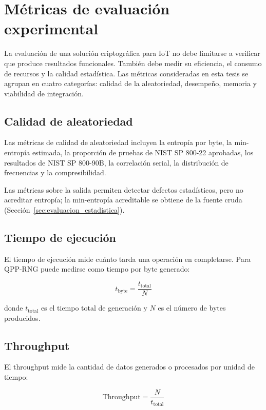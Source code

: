 \section{Métricas de evaluación experimental}

La evaluación de una solución criptográfica para IoT no debe limitarse a verificar que produce resultados funcionales. También debe medir su eficiencia, el consumo de recursos y la calidad estadística. Las métricas consideradas en esta tesis se agrupan en cuatro categorías: calidad de la aleatoriedad, desempeño, memoria y viabilidad de integración.

\subsection{Calidad de aleatoriedad}

Las métricas de calidad de aleatoriedad incluyen la entropía por byte, la min-entropía estimada, la proporción de pruebas de NIST SP 800-22 aprobadas, los resultados de NIST SP 800-90B, la correlación serial, la distribución de frecuencias y la compresibilidad.

Las métricas sobre la salida permiten detectar defectos estadísticos, pero no acreditar entropía; la min-entropía acreditable se obtiene de la fuente cruda (Sección~\ref{sec:evaluacion_estadistica}).

\subsection{Tiempo de ejecución}

El tiempo de ejecución mide cuánto tarda una operación en completarse. Para QPP-RNG puede medirse como tiempo por byte generado:

\begin{equation}
    t_{\text{byte}} = \frac{t_{\text{total}}}{N}
\end{equation}

donde $t_{\text{total}}$ es el tiempo total de generación y $N$ es el número de bytes producidos.

\subsection{Throughput}

El throughput mide la cantidad de datos generados o procesados por unidad de tiempo:

\begin{equation}
    \text{Throughput} = \frac{N}{t_{\text{total}}}
\end{equation}

